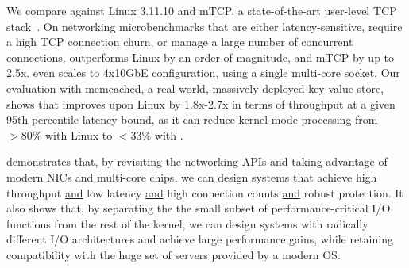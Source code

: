 



We compare \ix against Linux 3.11.10 and mTCP, a state-of-the-art
user-level TCP stack~\cite{jeong2014mtcp}.  On networking
microbenchmarks that are either latency-sensitive, require a high TCP
connection churn, or manage a large number of concurrent connections,
\ix outperforms Linux by an order of magnitude, and mTCP by up to
2.5x.  \ix even scales to 4x10GbE configuration, using a single
multi-core socket.  Our evaluation with memcached, a real-world,
massively deployed key-value store, shows that \ix improves upon Linux
by 1.8x-2.7x in terms of throughput at a given 95th percentile latency
bound, as it can reduce kernel mode processing from $>80\%$ with Linux
to $<33\%$ with \ix.

\ix demonstrates that, by revisiting the networking APIs and taking
advantage of modern NICs and multi-core chips, we can design systems
that achieve high throughput \underline{and} low latency
\underline{and} high connection counts \underline{and} robust
protection. It also shows that, by separating the the small subset of
performance-critical I/O functions from the rest of the kernel, we can
design systems with radically different I/O architectures and achieve
large performance gains, while retaining compatibility with the huge
set of servers provided by a modern OS.


